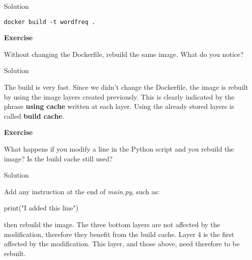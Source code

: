 \documentclass[
]{article}
\newenvironment{Shaded}{\begin{snugshade}}{\end{snugshade}}
\newcommand{\BuiltInTok}[1]{#1}
\newcommand{\NormalTok}[1]{#1}
\newcommand{\StringTok}[1]{\textcolor[rgb]{0.31,0.60,0.02}{#1}}
\newenvironment{infobox}[1]
  {
  \begin{itemize}
  \renewcommand{\labelitemi}{
    \raisebox{-.7\height}[0pt][0pt]{
      
    }
  }
  \setlength{\fboxsep}{1em}
  \begin{whitebox}
  \item
  }
  {
  \end{whitebox}
  \end{itemize}
  }
\theoremstyle{definition}
\theoremstyle{definition}
\theoremstyle{definition}
\theoremstyle{remark}
\let\BeginKnitrBlock\begin \let\EndKnitrBlock\end
\begin{document}
Solution

\begin{infobox}{exercisebox}

\begin{verbatim}
docker build -t wordfreq .
\end{verbatim}

\end{infobox}

\begin{infobox}{exercisebox}

\textbf{Exercise}

\BeginKnitrBlock{exercise}
\protect\hypertarget{exr:unnamed-chunk-21}{}{\label{exr:unnamed-chunk-21} }Without changing the Dockerfile, rebuild the same image.
What do you notice?
\EndKnitrBlock{exercise}

\end{infobox}

Solution

\begin{infobox}{exercisebox}

The build is very fast.
Since we didn't change the Dockerfile, the image
is rebuilt by using the image layers created
previously.
This is clearly indicated by the phrase \textbf{using cache} written
at each layer.
Using the already stored layers is called \textbf{build cache}.

\end{infobox}

\begin{infobox}{exercisebox}

\textbf{Exercise}

\BeginKnitrBlock{exercise}
\protect\hypertarget{exr:unnamed-chunk-22}{}{\label{exr:unnamed-chunk-22} }What happens if you modify a line in the Python script and
you rebuild the image?
Is the build cache still used?
\EndKnitrBlock{exercise}

\end{infobox}

Solution

\begin{infobox}{exercisebox}

Add any instruction at the end of \emph{main.py}, such as:

\begin{Shaded}
\begin{Highlighting}[]
\BuiltInTok{print}\NormalTok{(}\StringTok{"I added this line"}\NormalTok{)}
\end{Highlighting}
\end{Shaded}

then rebuild the image.
The three bottom layers are not affected by the modification, therefore
they benefit from the build cache.
Layer 4 is the first affected by the modification.
This layer, and those above, need therefore to be
rebuilt.

\end{infobox}
\end{document}
